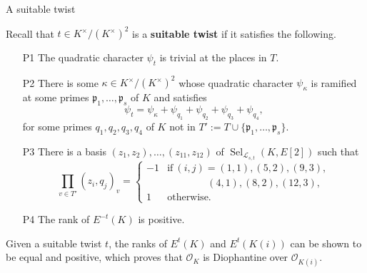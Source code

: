 \documentclass[10pt]{beamer}
\begin{document}
\begin{frame}[t]{A suitable twist}

Recall that $ t \in K^\times / (K^\times)^2 $ is a \textbf{suitable twist} if it satisfies the following.
\begin{itemize}
\item[P1] The quadratic character $ \psi_t $ is trivial at the places in $ T $.
\item[P2] There is some $ \kappa \in K^\times / (K^\times)^2 $ whose quadratic character $ \psi_\kappa $ is ramified at some primes $ \mathfrak{p}_1, \dots, \mathfrak{p}_s $ of $ K $ and satisfies
$$ \psi_t = \psi_\kappa + \psi_{q_1} + \psi_{q_2} + \psi_{q_3} + \psi_{q_4}, $$
for some primes $ q_1, q_2, q_3, q_4 $ of $ K $ not in $ T' := T \cup \{\mathfrak{p}_1, \dots, \mathfrak{p}_s\} $.
\item[P3] There is a basis $ (z_1, z_2), \dots, (z_{11}, z_{12}) $ of $ \operatorname{Sel}_{\mathcal{L}_{s, t}}(K, E[2]) $ such that
$$ \prod_{v \in T'} (z_i, q_j)_v =
\begin{cases}
-1 & \text{if} \ (i, j) = (1, 1), (5, 2), (9, 3), \\
& \qquad \qquad (4, 1), (8, 2), (12, 3), \\
1 & \text{otherwise}.
\end{cases}
$$
\item[P4] The rank of $ E^{-t}(K) $ is positive.
\end{itemize}
Given a suitable twist $ t $, the ranks of $ E^t(K) $ and $ E^t(K(i)) $ can be shown to be equal and positive, which proves that $ \mathcal{O}_K $ is Diophantine over $ \mathcal{O}_{K(i)} $.

\end{frame}
\end{document}

